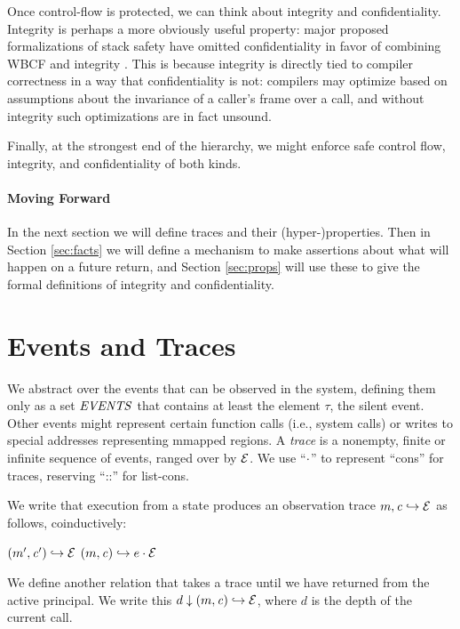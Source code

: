\documentclass[10pt,conference]{ieeetran}%
\theoremstyle{definition}
\begin{document}
Once control-flow is protected, we can think about integrity and confidentiality.
Integrity is perhaps a more obviously useful property: major proposed formalizations
of stack safety have omitted confidentiality in favor of combining WBCF and integrity
\cite{SkorstengaardSTKJFP}. This is because integrity is directly tied to compiler correctness
in a way that confidentiality is not: compilers may optimize based on assumptions
about the invariance of a caller's frame over a call, and without integrity such optimizations
are in fact unsound.

Finally, at the strongest end of the hierarchy, we might enforce safe control flow,
integrity, and confidentiality of both kinds.

\paragraph*{Moving Forward}

In the next section we will define traces and their (hyper-)properties.
Then in Section \ref{sec:facts} we will define a mechanism to make assertions
about what will happen on a future return, and Section \ref{sec:props} will use these
to give the formal definitions of integrity and confidentiality.

\section{Events and Traces}
\label{sec:events}

We abstract over the events that can be observed in the system, defining them
only as a set \(\mathit{EVENTS}\) that contains at least the element \(\tau\), the silent
event. Other events might represent certain function calls (i.e., system calls)
or writes to special addresses representing mmapped regions.
A {\em trace} is a nonempty, finite or infinite sequence
of events, ranged over by \(\mathcal{E}\).
We use ``\(\cdot\)'' to represent ``cons'' for traces, reserving ``::''
for list-cons.

We write that execution from a state produces an observation trace
\(m,\mathit{c} \hookrightarrow \mathcal{E}\) as follows, coinductively:

            {\((m',\mathit{c}') \hookrightarrow \mathcal{E}\)}
            {\((m,\mathit{c}) \hookrightarrow e \cdot \mathcal{E}\)}

We define another relation that takes a trace until we have returned from the
active principal.
We write this \(d \downarrow (m,\mathit{c}) \hookrightarrow \mathcal{E}\), where
\(d\) is the depth of the current call.
\end{document}
